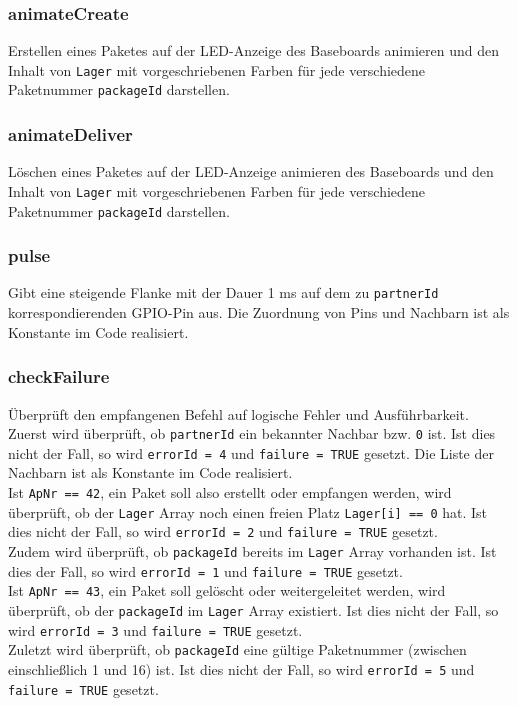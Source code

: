 \subsubsection*{animateCreate}
Erstellen eines Paketes auf der LED-Anzeige des Baseboards animieren und den Inhalt von \texttt{Lager} mit vorgeschriebenen Farben für jede verschiedene Paketnummer \texttt{packageId} darstellen.

\subsubsection*{animateDeliver}
Löschen eines Paketes auf der LED-Anzeige animieren des Baseboards und den Inhalt von \texttt{Lager} mit vorgeschriebenen Farben für jede verschiedene Paketnummer \texttt{packageId} darstellen.

\subsubsection*{pulse}
Gibt eine steigende Flanke mit der Dauer 1 ms auf dem zu \texttt{partnerId} korrespondierenden GPIO-Pin aus. Die Zuordnung von Pins und Nachbarn ist als Konstante im Code realisiert.

\subsubsection*{checkFailure}
Überprüft den empfangenen Befehl auf logische Fehler und Ausführbarkeit. 
\\
Zuerst wird überprüft, ob \texttt{partnerId} ein bekannter Nachbar bzw. \texttt{0} ist. Ist dies nicht der Fall, so wird \texttt{errorId = 4} und \texttt{failure = TRUE} gesetzt. Die Liste der Nachbarn ist als Konstante im Code realisiert.
\\
Ist \texttt{ApNr == 42}, ein Paket soll also erstellt oder empfangen werden, wird überprüft, ob der \texttt{Lager} Array noch einen freien Platz \texttt{Lager[i] == 0} hat. Ist dies nicht der Fall, so wird \texttt{errorId = 2} und \texttt{failure = TRUE} gesetzt.
\\
Zudem wird überprüft, ob \texttt{packageId} bereits im \texttt{Lager} Array vorhanden ist. Ist dies der Fall, so wird \texttt{errorId = 1} und \texttt{failure = TRUE} gesetzt.
\\
Ist \texttt{ApNr == 43}, ein Paket soll gelöscht oder weitergeleitet werden, wird überprüft, ob der \texttt{packageId} im \texttt{Lager} Array existiert. Ist dies nicht der Fall, so wird \texttt{errorId = 3} und \texttt{failure = TRUE} gesetzt.
\\
Zuletzt wird überprüft, ob \texttt{packageId} eine gültige Paketnummer (zwischen einschließlich 1 und 16) ist. Ist dies nicht der Fall, so wird \texttt{errorId = 5} und \texttt{failure = TRUE} gesetzt.


